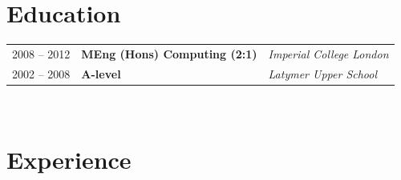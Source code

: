 \documentclass[10pt]{article} %
\begin{document}
%
%
%
%


\section{Education}
\hfill \break

\begin{tabular}{l l l}

2008 -- 2012 & \textbf{MEng (Hons) Computing (2:1)} & \textit{Imperial College London}\\
2002 -- 2008 & \textbf{A-level} & \textit{Latymer Upper School}\\

\end{tabular}\\[10pt]


\section{Experience}
\hfill \break
\end{document}

